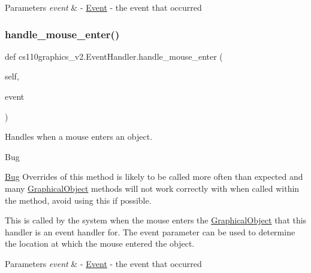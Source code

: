 \begin{DoxyParams}{Parameters}
{\em event} & -\/ \mbox{\hyperlink{classcs110graphics__v2_1_1Event}{Event}} -\/ the event that occurred \\
\hline
\end{DoxyParams}
\mbox{\label{classcs110graphics__v2_1_1EventHandler_a642711bb1f5c49ed0f0a1caf05dc14e4}} 
\subsubsection{\texorpdfstring{handle\_mouse\_enter()}{handle\_mouse\_enter()}}
{\footnotesize\ttfamily def cs110graphics\+\_\+v2.\+Event\+Handler.\+handle\+\_\+mouse\+\_\+enter (\begin{DoxyParamCaption}\item[{}]{self,  }\item[{}]{event }\end{DoxyParamCaption})}



Handles when a mouse enters an object. 

\begin{DoxyRefDesc}{Bug}
\item[\mbox{\hyperlink{bug__bug000001}{Bug}}]Overrides of this method is likely to be called more often than expected and many \mbox{\hyperlink{classcs110graphics__v2_1_1GraphicalObject}{Graphical\+Object}} methods will not work correctly with when called within the method, avoid using this if possible.\end{DoxyRefDesc}


This is called by the system when the mouse enters the \mbox{\hyperlink{classcs110graphics__v2_1_1GraphicalObject}{Graphical\+Object}} that this handler is an event handler for. The event parameter can be used to determine the location at which the mouse entered the object. 
\begin{DoxyCode}{0}
\end{DoxyCode}
 
\begin{DoxyParams}{Parameters}
{\em event} & -\/ \mbox{\hyperlink{classcs110graphics__v2_1_1Event}{Event}} -\/ the event that occurred \\
\hline
\end{DoxyParams}
\mbox{\label{classcs110graphics__v2_1_1EventHandler_a1a7544431c591f33313a2432222a2197}} 
